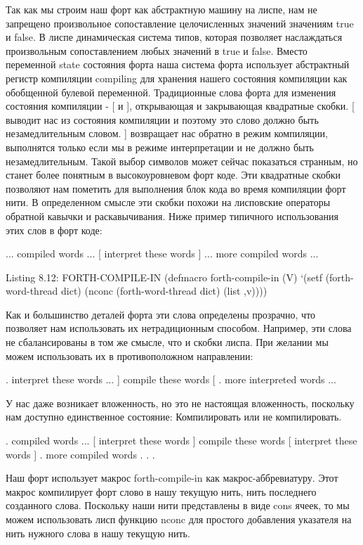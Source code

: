 Так как мы строим наш форт как абстрактную машину на лиспе, нам не запрещено произвольное сопоставление целочисленных значений значениям true и false. В лиспе динамическая система типов, которая позволяет наслаждаться произвольным сопоставлением любых значений в true и false. Вместо переменной state состояния форта наша система форта использует абстрактный регистр компиляции compiling для хранения нашего состояния компиляции как обобщенной булевой переменной. Традиционные слова форта для изменения состояния компиляции - [ и ], открывающая и закрывающая квадратные скобки. [ выводит нас из состояния компиляции и поэтому это слово должно быть незамедлительным словом. ] возвращает нас обратно в режим компиляции, выполнятся только если мы в режиме интерпретации и не должно быть незамедлительным. Такой выбор символов может сейчас показаться странным, но станет более понятным в высокоуровневом форт коде. Эти квадратные скобки позволяют нам пометить для выполнения блок кода во время компиляции форт нити. В определенном смысле эти скобки похожи на лисповские операторы обратной кавычки и раскавычивания. Ниже пример типичного использования этих слов в форт коде:

... compiled words ...
[ interpret these words ]
... more compiled words ...

Listing 8.12: FORTH-COMPILE-IN
(defmacro forth-compile-in (V)
‘(setf (forth-word-thread dict)
(nconc (forth-word-thread dict)
(list ,v))))

Как и большинство деталей форта эти слова определены прозрачно, что позволяет нам использовать их нетрадиционным способом. Например, эти слова не сбалансированы в том же смысле, что и скобки лиспа. При желании мы можем использовать их в противоположном направлении:

. interpret these words ...
] compile these words [
. more interpreted words ...

У нас даже возникает вложенность, но это не настоящая вложенность, поскольку нам доступно единственное состояние: Компилировать или не компилировать.

. compiled words ...
[ interpret these words
] compile these words [
interpret these words
]
. more compiled words . . .

Наш форт использует макрос forth-compile-in как макрос-аббревиатуру. Этот макрос компилирует форт слово в нашу текущую нить, нить последнего созданного слова. Поскольку наши нити представлены в виде cons ячеек, то мы можем использовать лисп функцию nconc для простого добавления указателя на нить нужного слова в нашу текущую нить.

